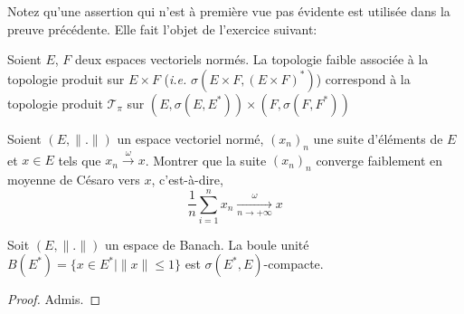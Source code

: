 Notez qu'une assertion qui n'est à première vue pas évidente est utilisée
dans la preuve précédente. Elle fait l'objet de l'exercice suivant:
\begin{exo}\label{faib:ex:prod}
  Soient $E$, $F$ deux espaces vectoriels normés. La topologie faible
  associée à la topologie produit sur $E\times F$ (\emph{i.e.}
  $\sigma\left(E\times F, (E\times F)^*\right)$) correspond à la
  topologie produit $\mathcal{T}_\pi$ sur
  $(E, \sigma(E, E^*))\times (F, \sigma(F, F^*))$
\end{exo}

\begin{exo}
  Soient $(E, \|.\|)$ un espace vectoriel normé, $(x_n)_n$ une suite
  d'éléments de $E$ et $x\in E$ tels que $x_n\xrightarrow{\omega}x$.
  Montrer que la suite $(x_n)_n$ converge faiblement en moyenne
  de Césaro vers $x$, c'est-à-dire,
  \begin{equation*}
    \frac{1}{n}\sum_{i=1}^nx_n\xrightarrow[n\to +\infty]{\omega} x
  \end{equation*}
\end{exo}

\begin{thm}
  Soit $(E, \|.\|)$ un espace de Banach. La boule unité
  $B(E^*)=\{x\in E^*\mid \|x\|\leq 1\}$ est $\sigma(E^*, E)$-compacte.
\end{thm}
\begin{proof}
  Admis.
\end{proof}




